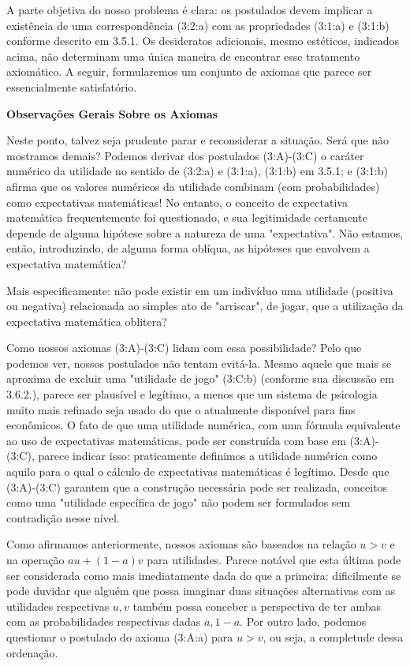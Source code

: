 \documentclass[a4paper,12pt]{article}[abntex2]
\begin{document}
A parte objetiva do nosso problema é clara: os postulados devem implicar a existência de uma correspondência (3:2:a) com as propriedades (3:1:a) e (3:1:b) conforme descrito em 3.5.1. Os desideratos adicionais, mesmo estéticos, indicados acima, não determinam uma única maneira de encontrar esse tratamento axiomático. A seguir, formularemos um conjunto de axiomas que parece ser essencialmente satisfatório.

\textbf{Observações Gerais Sobre os Axiomas}

Neste ponto, talvez seja prudente parar e reconsiderar a situação. Será que não mostramos demais? Podemos derivar dos postulados (3:A)-(3:C) o caráter numérico da utilidade no sentido de (3:2:a) e (3:1:a), (3:1:b) em 3.5.1; e (3:1:b) afirma que os valores numéricos da utilidade combinam (com probabilidades) como expectativas matemáticas! No entanto, o conceito de expectativa matemática frequentemente foi questionado, e sua legitimidade certamente depende de alguma hipótese sobre a natureza de uma "expectativa". Não estamos, então, introduzindo, de alguma forma oblíqua, as hipóteses que envolvem a expectativa matemática?

Mais especificamente: não pode existir em um indivíduo uma utilidade (positiva ou negativa) relacionada ao simples ato de "arriscar", de jogar, que a utilização da expectativa matemática oblitera?

Como nossos axiomas (3:A)-(3:C) lidam com essa possibilidade? Pelo que podemos ver, nossos postulados não tentam evitá-la. Mesmo aquele que mais se aproxima de excluir uma "utilidade de jogo" (3:C:b) (conforme sua discussão em 3.6.2.), parece ser plausível e legítimo, a menos que um sistema de psicologia muito mais refinado seja usado do que o atualmente disponível para fins econômicos. O fato de que uma utilidade numérica, com uma fórmula equivalente ao uso de expectativas matemáticas, pode ser construída com base em (3:A)-(3:C), parece indicar isso: praticamente definimos a utilidade numérica como aquilo para o qual o cálculo de expectativas matemáticas é legítimo. Desde que (3:A)-(3:C) garantem que a construção necessária pode ser realizada, conceitos como uma "utilidade específica de jogo" não podem ser formulados sem contradição nesse nível.

Como afirmamos anteriormente, nossos axiomas são baseados na relação \(u > v\) e na operação \(au + (1 - a)v\) para utilidades. Parece notável que esta última pode ser considerada como mais imediatamente dada do que a primeira: dificilmente se pode duvidar que alguém que possa imaginar duas situações alternativas com as utilidades respectivas \(u, v\) também possa conceber a perspectiva de ter ambas com as probabilidades respectivas dadas \(a, 1 - a\). Por outro lado, podemos questionar o postulado do axioma (3:A:a) para \(u > v\), ou seja, a completude dessa ordenação.
\end{document}
